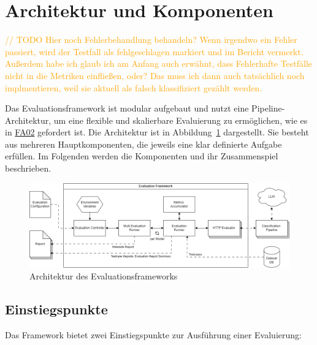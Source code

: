 \section{Architektur und Komponenten}\label{sec:architektur-und-komponenten}

\textcolor{orange}{// TODO Hier noch Fehlerbehandlung behandeln? Wenn irgendwo ein Fehler passiert, wird der Testfall als fehlgeschlagen markiert und im Bericht vermerkt. Außerdem habe ich glaub ich am Anfang auch erwähnt, dass Fehlerhafte Testfälle nicht in die Metriken einfließen, oder? Das muss ich dann auch tatsächlich noch implmentieren, weil sie aktuell als falsch klassifiziert gezählt werden.}

Das Evaluationsframework ist modular aufgebaut und nutzt eine Pipeline-Architektur, um eine flexible und skalierbare Evaluierung zu ermöglichen, wie es in \hyperlink{FA02}{FA02} gefordert ist. Die Architektur ist in Abbildung~\ref{fig:evaluation-framework-architecture} dargestellt. Sie besteht aus mehreren Hauptkomponenten, die jeweils eine klar definierte Aufgabe erfüllen. Im Folgenden werden die Komponenten und ihr Zusammenspiel beschrieben.

\begin{figure}
    \centering
    \includegraphics[width=\linewidth]{images/evaluation/evaluation-framework-architecture}
    \caption{Architektur des Evaluationsframeworks}
    \label{fig:evaluation-framework-architecture}
\end{figure}

\subsection*{Einstiegspunkte}

Das Framework bietet zwei Einstiegspunkte zur Ausführung einer Evaluierung:


